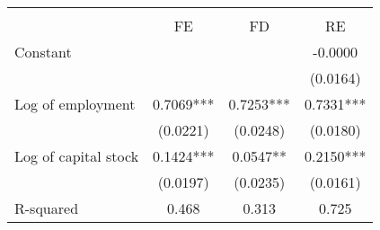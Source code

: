 \begin{tabular}{lccc}
\hline\hline\\[-1.8ex]
 & FE & FD & RE \\
\hline
Constant &  &  & -0.0000 \\
 &  &  & (0.0164) \\
Log of employment & 0.7069*** & 0.7253*** & 0.7331*** \\
 & (0.0221) & (0.0248) & (0.0180) \\
Log of capital stock & 0.1424*** & 0.0547** & 0.2150*** \\
 & (0.0197) & (0.0235) & (0.0161) \\
\hline
R-squared & 0.468 & 0.313 & 0.725 \\
\hline\hline
\end{tabular}